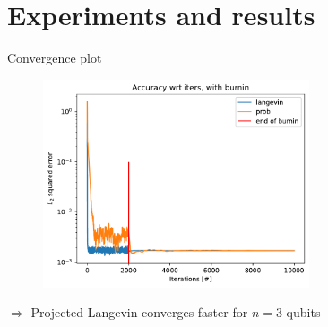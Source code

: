 \documentclass{beamer}
\begin{document}
\section{Experiments and results}


\begin{frame}{Convergence plot}
    
\begin{figure}[H]
        \centering
        \includegraphics[width=0.7\textwidth]{figures/experiments/baseline/iters_acc_comp_iters_no_avg-1.png}
    
\end{figure}
$\Longrightarrow$ Projected Langevin converges faster for $n=3$ qubits
\end{frame}
\end{document}
